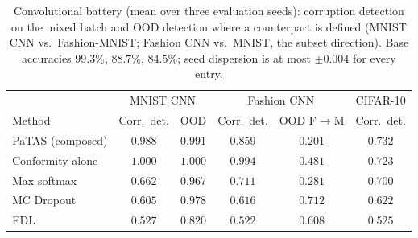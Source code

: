 \begin{table}[ht]
\centering\footnotesize
\setlength{\tabcolsep}{4pt}
\begin{tabular}{lccccc}
\toprule
 & \multicolumn{2}{c}{MNIST CNN} & \multicolumn{2}{c}{Fashion CNN} & CIFAR-10 \\
Method & Corr.\ det. & OOD & Corr.\ det. & OOD F$\to$M & Corr.\ det. \\
\midrule
PaTAS (composed) & $0.988$ & $0.991$ & $0.859$ & $0.201$ & $\mathbf{0.732}$ \\
Conformity alone & $\mathbf{1.000}$ & $\mathbf{1.000}$ & $\mathbf{0.994}$ & $0.481$ & $0.723$ \\
Max softmax & $0.662$ & $0.967$ & $0.711$ & $0.281$ & $0.700$ \\
MC Dropout & $0.605$ & $0.978$ & $0.616$ & $\mathbf{0.712}$ & $0.622$ \\
EDL & $0.527$ & $0.820$ & $0.522$ & $0.608$ & $0.525$ \\
\bottomrule
\end{tabular}
\caption{Convolutional battery (mean over three evaluation seeds): corruption detection on the mixed batch and OOD detection where a counterpart is defined (MNIST CNN vs.\ Fashion-MNIST; Fashion CNN vs.\ MNIST, the subset direction). Base accuracies $99.3\%$, $88.7\%$, $84.5\%$; seed dispersion is at most $\pm 0.004$ for every entry.}
\label{tab:conv}
\end{table}
